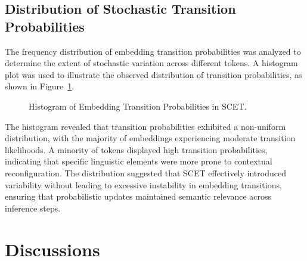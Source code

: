\documentclass{article}
\begin{document}
\subsection{Distribution of Stochastic Transition Probabilities}

The frequency distribution of embedding transition probabilities was analyzed to determine the extent of stochastic variation across different tokens. A histogram plot was used to illustrate the observed distribution of transition probabilities, as shown in Figure~\ref{fig:transition_probabilities}.

\begin{figure}[h]
	\centering
	\caption{Histogram of Embedding Transition Probabilities in SCET.}
	\label{fig:transition_probabilities}
\end{figure}

The histogram revealed that transition probabilities exhibited a non-uniform distribution, with the majority of embeddings experiencing moderate transition likelihoods. A minority of tokens displayed high transition probabilities, indicating that specific linguistic elements were more prone to contextual reconfiguration. The distribution suggested that SCET effectively introduced variability without leading to excessive instability in embedding transitions, ensuring that probabilistic updates maintained semantic relevance across inference steps.



\section{Discussions}
\end{document}
